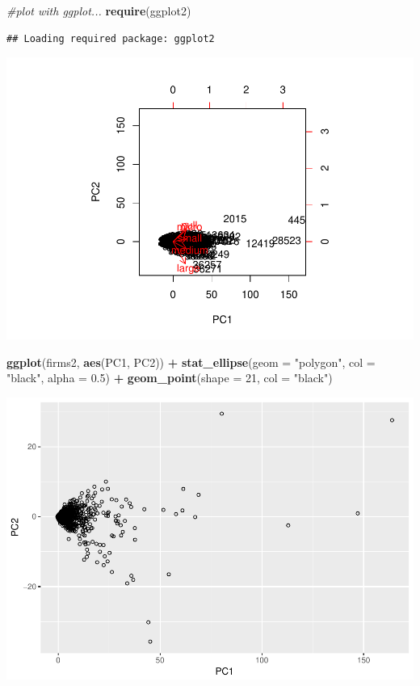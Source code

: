 \documentclass[]{article}
\newenvironment{Shaded}{\begin{snugshade}}{\end{snugshade}}
\newcommand{\KeywordTok}[1]{\textcolor[rgb]{0.13,0.29,0.53}{\textbf{#1}}}
\newcommand{\DataTypeTok}[1]{\textcolor[rgb]{0.13,0.29,0.53}{#1}}
\newcommand{\DecValTok}[1]{\textcolor[rgb]{0.00,0.00,0.81}{#1}}
\newcommand{\FloatTok}[1]{\textcolor[rgb]{0.00,0.00,0.81}{#1}}
\newcommand{\StringTok}[1]{\textcolor[rgb]{0.31,0.60,0.02}{#1}}
\newcommand{\CommentTok}[1]{\textcolor[rgb]{0.56,0.35,0.01}{\textit{#1}}}
\newcommand{\OperatorTok}[1]{\textcolor[rgb]{0.81,0.36,0.00}{\textbf{#1}}}
\newcommand{\NormalTok}[1]{#1}
\begin{document}
\begin{Shaded}
\begin{Highlighting}[]
\CommentTok{#plot with ggplot...}
\KeywordTok{require}\NormalTok{(ggplot2)}
\end{Highlighting}
\end{Shaded}

\begin{verbatim}
## Loading required package: ggplot2
\end{verbatim}

\includegraphics{TSLproject_files/figure-latex/unnamed-chunk-8-2.pdf}

\begin{Shaded}
\begin{Highlighting}[]
\KeywordTok{ggplot}\NormalTok{(firms2, }\KeywordTok{aes}\NormalTok{(PC1, PC2)) }\OperatorTok{+}\StringTok{ }
\StringTok{  }\KeywordTok{stat_ellipse}\NormalTok{(}\DataTypeTok{geom =} \StringTok{"polygon"}\NormalTok{, }\DataTypeTok{col =} \StringTok{"black"}\NormalTok{, }\DataTypeTok{alpha =} \FloatTok{0.5}\NormalTok{) }\OperatorTok{+}\StringTok{ }
\StringTok{  }\KeywordTok{geom_point}\NormalTok{(}\DataTypeTok{shape =} \DecValTok{21}\NormalTok{, }\DataTypeTok{col =} \StringTok{"black"}\NormalTok{)}
\end{Highlighting}
\end{Shaded}

\includegraphics{TSLproject_files/figure-latex/unnamed-chunk-8-3.pdf}
\end{document}
